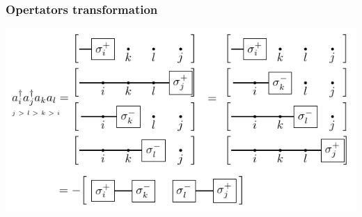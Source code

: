 \documentclass{beamer}
\renewcommand{\(}{\left(}
\renewcommand{\)}{\right)}
\renewcommand{\[}{\left[}
\renewcommand{\]}{\right]}
\begin{document}
\begin{frame}
    \frametitle{Opertators transformation}

    \begin{center}

        \includegraphics[scale = 1]{four_point_op_trans.pdf}
    \end{center}

\end{frame}

            
\end{document}
